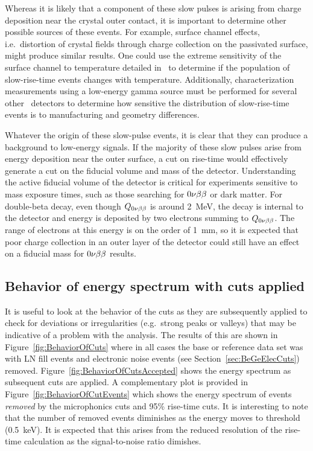 Whereas it is likely that a component of these slow pulses is arising from charge deposition near the crystal outer contact, it is important to determine other possible sources of these events.  For example, surface channel effects, i.e.~distortion of crystal fields through charge collection on the passivated surface, might produce similar results.  One could use the extreme sensitivity of the surface channel to temperature detailed in~\cite{Hull1995488} to determine if the population of slow-rise-time events changes with temperature.  Additionally, characterization measurements using a low-energy gamma source must be performed for several other \ppc~detectors to determine how sensitive the distribution of slow-rise-time events is to manufacturing and geometry differences.  

Whatever the origin of these slow-pulse events, it is clear that they can produce a background to low-energy signals.  If the majority of these slow pulses arise from energy deposition near the outer surface, a cut on rise-time would effectively generate a cut on the fiducial volume and mass of the detector.  Understanding the active fiducial volume of the detector is critical for experiments sensitive to mass exposure times, such as those searching for $0 \nu \beta \beta$ or dark matter.  For double-beta decay, even though $Q_{0 \nu \beta \beta}$ is around 2~MeV, the decay is internal to the detector and energy is deposited by two electrons summing to $Q_{0 \nu \beta \beta}$.  The range of electrons at this energy is on the order of 1~mm, so it is expected that poor charge collection in an outer layer of the detector could still have an effect on a fiducial mass for $0 \nu \beta \beta$ results.  


	\subsection{Behavior of energy spectrum with cuts applied}
	\label{sec:RTBeGeBehaviorOfCuts}
It is useful to look at the behavior of the cuts as they are subsequently applied to check for deviations or irregularities (e.g.~strong peaks or valleys) that may be indicative
of a problem with the analysis.  The results of this are shown in Figure~\ref{fig:BehaviorOfCuts} where in all cases the base or reference data set was with LN fill events and electronic noise events (see Section~\ref{sec:BeGeElecCuts}) removed.
					Figure~\ref{fig:BehaviorOfCutsAccepted} shows the energy spectrum as subsequent cuts are applied.  A complementary plot is provided in Figure~\ref{fig:BehaviorOfCutEvents} which shows the energy spectrum of events \emph{removed} by the microphonics cuts and 95\% rise-time cuts.  It is interesting to note   
that the number of removed events diminishes as the energy moves to threshold (0.5~keV).  It is expected that this arises from the reduced resolution of the rise-time calculation 
as the signal-to-noise ratio dimishes.

